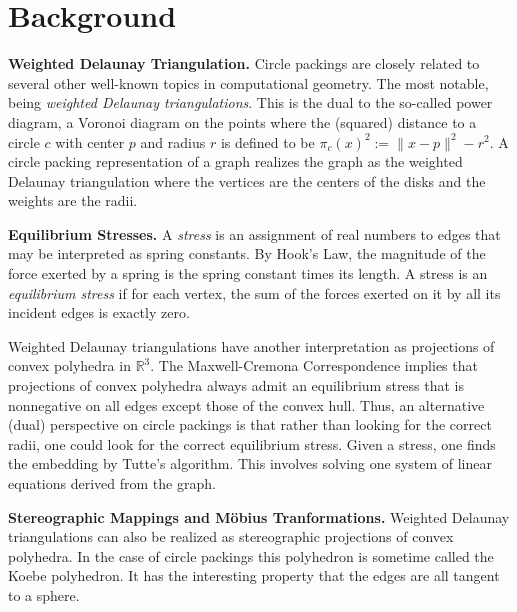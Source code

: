 \documentclass[a4paper,UKenglish]{lipics-v2016}
\newcommand{\R}{\mathbb{R}}
\begin{document}
\section{Background}
\label{sec:background}

  \textbf{Weighted Delaunay Triangulation.}
  Circle packings are closely related to several other well-known topics in computational geometry.
  The most notable, being \emph{weighted Delaunay triangulations}.  
  This is the dual to the so-called power diagram, a Voronoi diagram on the points where the (squared) distance to a circle $c$ with center $p$ and radius $r$ is defined to be $\pi_c(x)^2 := \|x-p\|^2 - r^2$.
  A circle packing representation of a graph realizes the graph as the weighted Delaunay triangulation where the vertices are the centers of the disks and the weights are the radii.
  
  \textbf{Equilibrium Stresses.}
    A \emph{stress} is an assignment of real numbers to edges that may be interpreted as spring constants.
    By Hook's Law, the magnitude of the force exerted by a spring is the spring constant times its length.
    A stress is an \emph{equilibrium stress} if for each vertex, the sum of the forces exerted on it by all its incident edges is exactly zero.
    
    Weighted Delaunay triangulations have another interpretation as projections of convex polyhedra in $\R^3$.
    The Maxwell-Cremona Correspondence implies that projections of convex polyhedra always admit an equilibrium stress that is nonnegative on all edges except those of the convex hull.
    Thus, an alternative (dual) perspective on circle packings is that rather than looking for the correct radii, one could look for the correct equilibrium stress.
    Given a stress, one finds the embedding by Tutte's algorithm.
    This involves solving one system of linear equations derived from the graph.
  
  \textbf{Stereographic Mappings and M\"{o}bius Tranformations.} 
    Weighted Delaunay triangulations can also be realized as stereographic projections of convex polyhedra.
    In the case of circle packings this polyhedron is sometime called the Koebe polyhedron.
    It has the interesting property that the edges are all tangent to a sphere.
\end{document}
